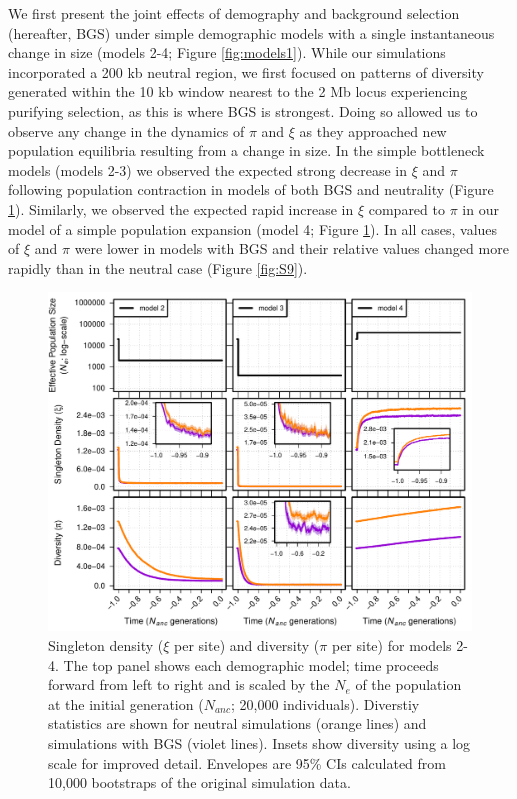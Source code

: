 \documentclass[9pt,twocolumn,twoside]{rilabRxiv}
\begin{document}
We first present the joint effects of demography and background selection (hereafter, BGS) under simple demographic models with a single instantaneous change in size (models 2-4; Figure \ref{fig:models1}).
While our simulations incorporated a 200 kb neutral region, we first focused on patterns of diversity generated within the 10 kb window nearest to the 2 Mb locus experiencing purifying selection, as this is where BGS is strongest.
Doing so allowed us to observe any change in the dynamics of $\pi$ and $\xi$ as they approached new population equilibria resulting from a change in size.
In the simple bottleneck models (models 2-3) we observed the expected strong decrease in $\xi$ and $\pi$ following  population contraction in models of both BGS and neutrality (Figure \ref{fig:S6}).
Similarly, we observed the expected rapid increase in $\xi$ compared to $\pi$ in our model of a simple population expansion (model 4; Figure \ref{fig:S6}).
In all cases, values of $\xi$ and $\pi$ were lower in models with BGS and their relative values changed more rapidly than in the neutral case (Figure \ref{fig:S9}).

\begin{figure}[]
\includegraphics[width=\linewidth]{figures/FigS6_new.pdf}
\caption{Singleton density ($\xi$ per site) and diversity ($\pi$ per site) for models 2-4.
The top panel shows each demographic model; time proceeds forward from left to right and is scaled by the $N_e$ of the population at the initial generation ($N_{anc}$; 20,000 individuals).
Diverstiy statistics are shown for neutral simulations (orange lines) and simulations with BGS (violet lines).
Insets show diversity using a log scale for improved detail.
Envelopes are 95\% CIs calculated from 10,000 bootstraps of the original simulation data.}
\label{fig:S6}
\end{figure}
\end{document}
